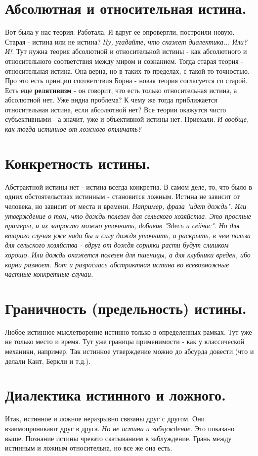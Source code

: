 \section{ Абсолютная и относительная истина.}
Вот была у нас теория. Работала. И вдруг ее опровергли, построили новую. Старая - истина или не истина? \textit{Ну, угадайте, что скажет диалектика... Или? И!}. Тут нужна теория абсолютной и относительной истины - как абсолютного и относительного соответствия между миром и сознанием. Тогда старая теория - относительная истина. Она верна, но в таких-то пределах, с такой-то точностью. Про это есть принцип соответствия Борна - новая теория согласуется со старой. Есть еще \textbf{релятивизм} - он говорит, что есть только относительная истина, а абсолютной нет. Уже видна проблема? К чему же тогда приближается относительная истина, если абсолютной нет? Все теории окажутся чисто субъективными - а значит, уже и объективной истины нет. Приехали. \textit{И вообще, как тогда истинное от ложного отличать?}

\section{ Конкретность истины.}
Абстрактной истины нет - истина всегда конкретна. В самом деле, то, что было в одних обстоятельствах истинным - становится ложным. Истина не зависит от человека, но зависит от места и времени. \textit{Например, фраза "идет дождь". Или утверждение о том, что дождь полезен для сельского хозяйства. Это простые примеры, и их запросто можно уточнить, добавив "Здесь и сейчас". Но для второго случая уже надо бы и силу дождя уточнить, и раскрыть, в чем польза для сельского хозяйства - вдруг от дождя сорняки расти будут слишком хорошо. Или дождь окажется полезен для пшеницы, а для клубники вреден, ибо корни размоет. Вот и разрослась абстрактная истина во всевозможные частные конкретные случаи.}

\section{ Граничность (предельность) истины.}
Любое истинное мыслетворение истинно только в определенных рамках. Тут уже не только место и время. Тут уже границы применимости - как у классической механики, например. Так истинное утверждение можно до абсурда довести (что и делали Кант, Беркли и т.д.).

\section{ Диалектика истинного и ложного.}
Итак, истинное и ложное неразрывно связаны друг с другом. Они взаимопроникают друг в друга. \textit{Но не истина и заблуждение}. Это показано выше. Познание истины чревато скатыванием в заблуждение. Грань между истинным и ложным относительна, но все же она есть.

